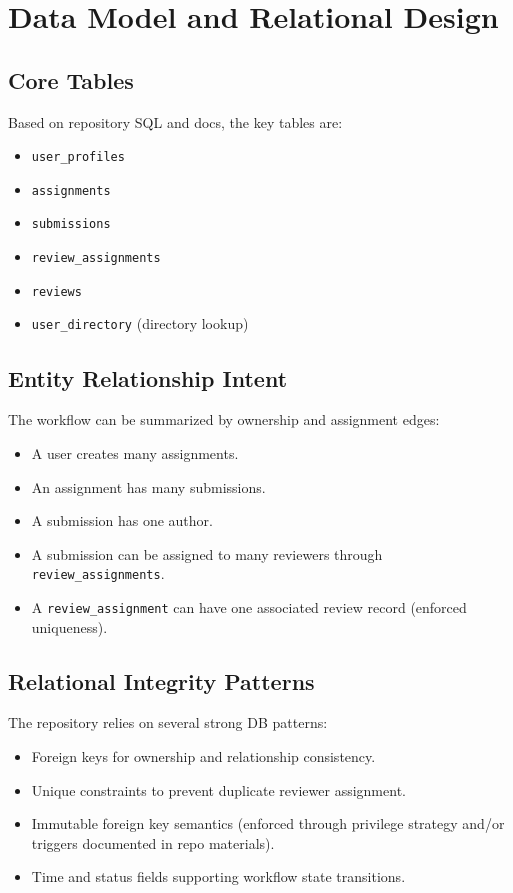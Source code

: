 \documentclass[11pt]{article}
\begin{document}
\section{Data Model and Relational Design}
\subsection{Core Tables}
Based on repository SQL and docs, the key tables are:
\begin{itemize}[leftmargin=*]
  \item \texttt{user\_profiles}
  \item \texttt{assignments}
  \item \texttt{submissions}
  \item \texttt{review\_assignments}
  \item \texttt{reviews}
  \item \texttt{user\_directory} (directory lookup)
\end{itemize}

\subsection{Entity Relationship Intent}
The workflow can be summarized by ownership and assignment edges:
\begin{itemize}[leftmargin=*]
  \item A user creates many assignments.
  \item An assignment has many submissions.
  \item A submission has one author.
  \item A submission can be assigned to many reviewers through \texttt{review\_assignments}.
  \item A \texttt{review\_assignment} can have one associated review record (enforced uniqueness).
\end{itemize}

\subsection{Relational Integrity Patterns}
The repository relies on several strong DB patterns:
\begin{itemize}[leftmargin=*]
  \item Foreign keys for ownership and relationship consistency.
  \item Unique constraints to prevent duplicate reviewer assignment.
  \item Immutable foreign key semantics (enforced through privilege strategy and/or triggers documented in repo materials).
  \item Time and status fields supporting workflow state transitions.
\end{itemize}
\end{document}

